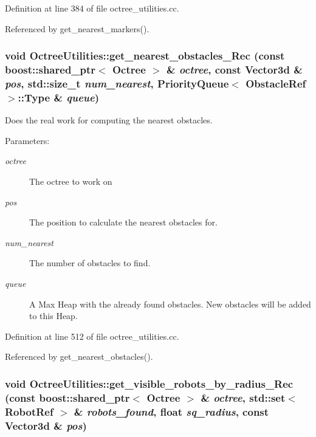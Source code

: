 Definition at line 384 of file octree\_\-utilities.cc.

Referenced by get\_\-nearest\_\-markers().\hypertarget{class_octree_utilities_168f67374ca6c78060e016441c11f399}{
\subsubsection[get\_\-nearest\_\-obstacles\_\-Rec]{\setlength{\rightskip}{0pt plus 5cm}void OctreeUtilities::get\_\-nearest\_\-obstacles\_\-Rec (const boost::shared\_\-ptr$<$ {\bf Octree} $>$ \& {\em octree}, \/  const Vector3d \& {\em pos}, \/  std::size\_\-t {\em num\_\-nearest}, \/  PriorityQueue$<$ ObstacleRef $>$::Type \& {\em queue})}}
\label{class_octree_utilities_168f67374ca6c78060e016441c11f399}


Does the real work for computing the nearest obstacles.

\begin{Desc}
\item[Parameters:]
\begin{description}
\item[{\em octree}]The octree to work on \item[{\em pos}]The position to calculate the nearest obstacles for. \item[{\em num\_\-nearest}]The number of obstacles to find. \item[{\em queue}]A Max Heap with the already found obstacles. New obstacles will be added to this Heap. \end{description}
\end{Desc}


Definition at line 512 of file octree\_\-utilities.cc.

Referenced by get\_\-nearest\_\-obstacles().\hypertarget{class_octree_utilities_6f5879dfd1fd84edcadb03de4cf03dd6}{
\subsubsection[get\_\-visible\_\-robots\_\-by\_\-radius\_\-Rec]{\setlength{\rightskip}{0pt plus 5cm}void OctreeUtilities::get\_\-visible\_\-robots\_\-by\_\-radius\_\-Rec (const boost::shared\_\-ptr$<$ {\bf Octree} $>$ \& {\em octree}, \/  std::set$<$ RobotRef $>$ \& {\em robots\_\-found}, \/  float {\em sq\_\-radius}, \/  const Vector3d \& {\em pos})}}
\label{class_octree_utilities_6f5879dfd1fd84edcadb03de4cf03dd6}


